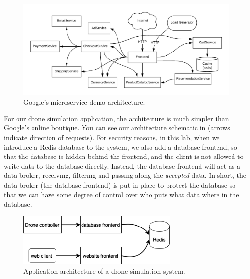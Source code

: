 \documentclass{article}
\begin{document}
\begin{figure}[h!]
    \centering
    \includegraphics[width=150mm]{architecture-diagram.png}
    \caption{Google's microservice demo architecture.}
    \label{fig:hipster}
\end{figure}

For our drone simulation application, the architecture is much simpler than Google's online boutique. You can see our architecture schematic in  (arrows indicate direction of requests). 
For security reasons, in this lab, when we introduce a Redis database to the system, we also add a database frontend, so that the database is hidden behind the frontend, and the client is not allowed to write data to the database directly. Instead, the database frontend will act as a data broker, receiving, filtering and passing along the \textit{accepted} data. In short, the data broker (the database frontend) is put in place to protect the database so that we can have some degree of control over who puts what data where in the database.

\begin{figure}[ht!]
    \centering
    \includegraphics[width=80mm]{drone-system-architecture.drawio.png}
    \caption{Application architecture of a drone simulation system.}
    \label{fig:drone}
\end{figure}
\end{document}
